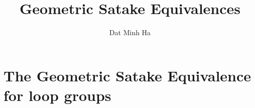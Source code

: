 

\setcounter{section}{-1}





    \title{Geometric Satake Equivalences}
    
    \author{Dat Minh Ha}
    \maketitle
    
    \begin{abstract}
    
    \end{abstract}
    
    {
        \hypersetup{} 
        \tableofcontents %
    }
    
    \chapter{The Geometric Satake Equivalence for loop groups}
        
    
    \printbibliography

